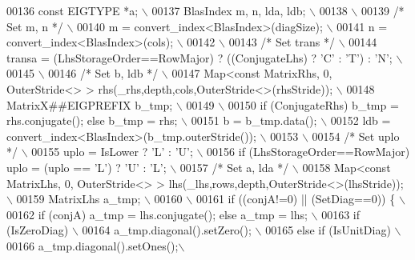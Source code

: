 \begin{DoxyCode}
00136 \textcolor{preprocessor}{   const EIGTYPE *a; \(\backslash\)}
00137 \textcolor{preprocessor}{   BlasIndex m, n, lda, ldb; \(\backslash\)}
00138 \textcolor{preprocessor}{\(\backslash\)}
00139 \textcolor{preprocessor}{}\textcolor{comment}{/* Set m, n */}\textcolor{preprocessor}{ \(\backslash\)}
00140 \textcolor{preprocessor}{   m = convert\_index<BlasIndex>(diagSize); \(\backslash\)}
00141 \textcolor{preprocessor}{   n = convert\_index<BlasIndex>(cols); \(\backslash\)}
00142 \textcolor{preprocessor}{\(\backslash\)}
00143 \textcolor{preprocessor}{}\textcolor{comment}{/* Set trans */}\textcolor{preprocessor}{ \(\backslash\)}
00144 \textcolor{preprocessor}{   transa = (LhsStorageOrder==RowMajor) ? ((ConjugateLhs) ? 'C' : 'T') : 'N'; \(\backslash\)}
00145 \textcolor{preprocessor}{\(\backslash\)}
00146 \textcolor{preprocessor}{}\textcolor{comment}{/* Set b, ldb */}\textcolor{preprocessor}{ \(\backslash\)}
00147 \textcolor{preprocessor}{   Map<const MatrixRhs, 0, OuterStride<> > rhs(\_rhs,depth,cols,OuterStride<>(rhsStride)); \(\backslash\)}
00148 \textcolor{preprocessor}{   MatrixX##EIGPREFIX b\_tmp; \(\backslash\)}
00149 \textcolor{preprocessor}{\(\backslash\)}
00150 \textcolor{preprocessor}{   if (ConjugateRhs) b\_tmp = rhs.conjugate(); else b\_tmp = rhs; \(\backslash\)}
00151 \textcolor{preprocessor}{   b = b\_tmp.data(); \(\backslash\)}
00152 \textcolor{preprocessor}{   ldb = convert\_index<BlasIndex>(b\_tmp.outerStride()); \(\backslash\)}
00153 \textcolor{preprocessor}{\(\backslash\)}
00154 \textcolor{preprocessor}{}\textcolor{comment}{/* Set uplo */}\textcolor{preprocessor}{ \(\backslash\)}
00155 \textcolor{preprocessor}{   uplo = IsLower ? 'L' : 'U'; \(\backslash\)}
00156 \textcolor{preprocessor}{   if (LhsStorageOrder==RowMajor) uplo = (uplo == 'L') ? 'U' : 'L'; \(\backslash\)}
00157 \textcolor{preprocessor}{}\textcolor{comment}{/* Set a, lda */}\textcolor{preprocessor}{ \(\backslash\)}
00158 \textcolor{preprocessor}{   Map<const MatrixLhs, 0, OuterStride<> > lhs(\_lhs,rows,depth,OuterStride<>(lhsStride)); \(\backslash\)}
00159 \textcolor{preprocessor}{   MatrixLhs a\_tmp; \(\backslash\)}
00160 \textcolor{preprocessor}{\(\backslash\)}
00161 \textcolor{preprocessor}{   if ((conjA!=0) || (SetDiag==0)) \{ \(\backslash\)}
00162 \textcolor{preprocessor}{     if (conjA) a\_tmp = lhs.conjugate(); else a\_tmp = lhs; \(\backslash\)}
00163 \textcolor{preprocessor}{     if (IsZeroDiag) \(\backslash\)}
00164 \textcolor{preprocessor}{       a\_tmp.diagonal().setZero(); \(\backslash\)}
00165 \textcolor{preprocessor}{     else if (IsUnitDiag) \(\backslash\)}
00166 \textcolor{preprocessor}{       a\_tmp.diagonal().setOnes();\(\backslash\)}

\end{DoxyCode}
